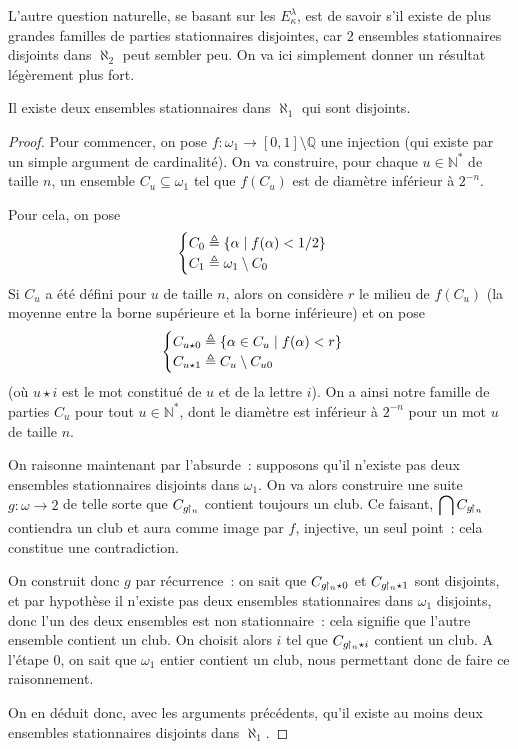 L'autre question naturelle, se basant sur les $E_\kappa^\lambda$, est de savoir
s'il existe de plus grandes familles de parties stationnaires disjointes, car
$2$ ensembles stationnaires disjoints dans $\aleph_2$ peut sembler peu. On va
ici simplement donner un résultat légèrement plus fort.

\begin{proposition}\label{prop.al1.deuxdis}
  Il existe deux ensembles stationnaires dans $\aleph_1$ qui sont disjoints.
\end{proposition}

\begin{proof}
  Pour commencer, on pose $f : \omega_1 \to [0,1]\setminus \mathbb Q$ une
  injection (qui existe par un simple argument de cardinalité). On va
  construire, pour chaque $u \in \mathbb N^*$ de taille $n$, un ensemble
  $C_u\subseteq \omega_1$ tel que $f(C_u)$ est de diamètre inférieur à
  $2^{-n}$.

  Pour cela, on pose
  \[\begin{cases}
  C_0 \triangleq \{\alpha \mid f(\alpha) < 1/2\}\\
  C_1 \triangleq \omega_1\setminus C_0
  \end{cases}\]
  Si $C_u$ a été défini pour $u$ de taille $n$, alors on considère $r$ le
  milieu de $f(C_u)$
  (la moyenne entre la borne supérieure et la borne inférieure) et on pose
  \[\begin{cases}
  C_{u\star 0} \triangleq \{\alpha \in C_u \mid f(\alpha) < r\}\\
  C_{u\star 1} \triangleq C_u \setminus C_{u0}
  \end{cases}\]
  (où $u\star i$ est le mot constitué de $u$ et de la lettre $i$).
  On a ainsi notre famille de parties $C_u$ pour tout $u \in \mathbb N^*$, dont
  le diamètre est inférieur à $2^{-n}$ pour un mot $u$ de taille $n$.

  On raisonne maintenant par l'absurde~: supposons qu'il n'existe pas deux
  ensembles stationnaires disjoints dans $\omega_1$. On va alors construire une
  suite $g : \omega \to 2$ de telle sorte que $C_{g\!\upharpoonright_{n}}$ contient toujours
  un club. Ce faisant, $\displaystyle\bigcap C_{g\!\upharpoonright_{n}}$ contiendra un club
  et aura comme image par $f$, injective, un seul point~: cela constitue une
  contradiction.

  On construit donc $g$ par récurrence~: on sait que $C_{g\!\upharpoonright_{n}\star 0}$ et
  $C_{g\!\upharpoonright_{n}\star 1}$ sont disjoints, et par hypothèse il n'existe
  pas deux ensembles stationnaires dans $\omega_1$ disjoints, donc l'un des
  deux ensembles est non stationnaire~: cela signifie que l'autre ensemble
  contient un club. On choisit alors $i$ tel que $C_{g\!\upharpoonright_{n} \star i}$
  contient un club. A l'étape $0$, on sait que $\omega_1$ entier contient un
  club, nous permettant donc de faire ce raisonnement.

  On en déduit donc, avec les arguments précédents, qu'il existe au moins deux
  ensembles stationnaires disjoints dans $\aleph_1$.
\end{proof}

